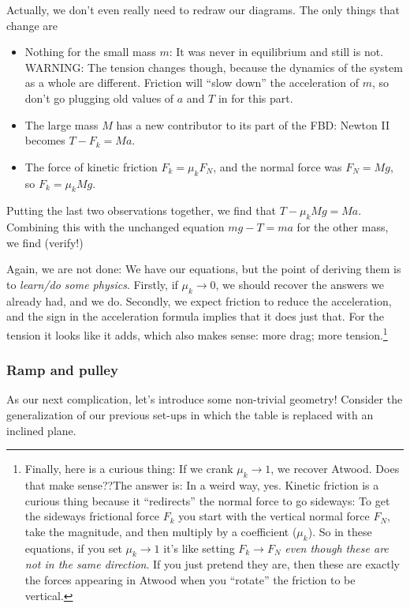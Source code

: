 Actually, we don't even really need to redraw our diagrams. The only things that change are
\begin{itemize}
\item Nothing for the small mass $m$: It was never in equilibrium and still is not. WARNING: The tension changes though, because the dynamics of the system as a whole are different. Friction will “slow down” the acceleration of $m$, so don't go plugging old values of $a$ and $T$ in for this part.
\item The large mass $M$ has a new contributor to its part of the FBD: Newton II becomes $T-F_k=Ma$.
\item The force of kinetic friction $F_k = μ_k F_N$, and the normal force was $F_N= Mg$, so $F_k = μ_k Mg$. 
\end{itemize}

Putting the last two observations together, we find that $T-μ_k Mg = Ma$. Combining this with the unchanged equation $mg - T = ma$ for the other mass, we find (verify!)


Again, we are not done: We have our equations, but the point of deriving them is to {\em learn/do some physics}. Firstly, if $μ_k→ 0$, we should recover the answers we already had, and we do. Secondly, we expect friction to reduce the acceleration, and the sign in the acceleration formula implies that it does just that. For the tension it looks like it adds, which also makes sense: more drag; more tension.\footnote{Finally, here is a curious thing: If we crank $μ_k→ 1$, we recover Atwood. Does that make sense??The answer is: In a weird way, yes. Kinetic friction is a curious thing because it “redirects” the normal force to go sideways: To get the sideways frictional force $F_k$ you start with the vertical normal force $F_N$, take the magnitude, and then multiply by a coefficient ($μ_k$). So in these equations, if you set $μ_k→ 1$ it's like setting $F_k → F_N$ {\em even though these are not in the same direction}. If you just pretend they are, then these are exactly the forces appearing in Atwood when you “rotate” the friction to be vertical.}

\subsubsection{Ramp and pulley}
\label{S:RampPulley}


As our next complication, let's introduce some non-trivial geometry! Consider the generalization of our previous set-ups in which the table is replaced with an inclined plane.

